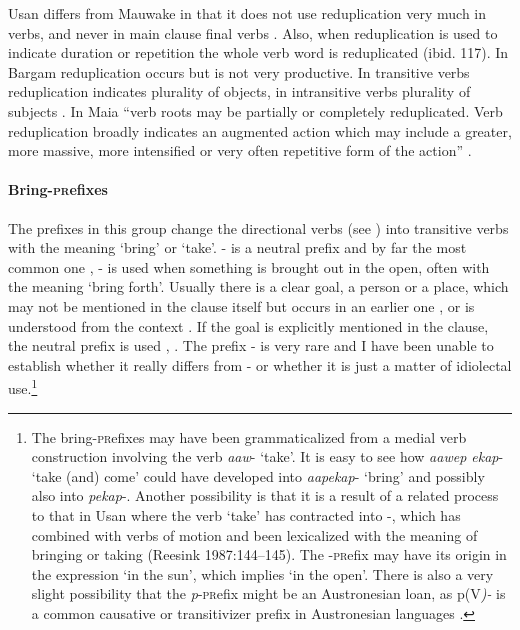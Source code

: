 Usan differs from Mauwake in that it does not use reduplication very much in verbs, and never in main clause final verbs \citep[116]{Reesink1987}. Also, when reduplication is used to indicate duration or repetition the whole verb word is reduplicated (ibid. 117). In Bargam reduplication occurs but is not very productive. In transitive verbs reduplication indicates plurality of objects, in intransitive verbs plurality of subjects \citep[19]{Hepner2002}. In Maia ``{verb roots may be partially or completely reduplicated. Verb reduplication broadly indicates an augmented action which may include a greater, more massive, more intensified or very often repetitive form of the action}'' \citep[50]{Hardin2002}.

\paragraph{Bring-\textsc{pr}efixes}\label{sec:3.8.2.4.2}
{}
The prefixes in this group change the directional verbs (see ) into transitive verbs with the meaning `bring' or `take'. \nobreakdash- is a neutral prefix and by far the most common one , \nobreakdash- is used when something is brought out in the open, often with the meaning `bring forth'. Usually there is a clear goal, a person or a place, which may not be mentioned in the clause itself but occurs in an earlier one , or is understood from the context . If the goal is explicitly mentioned in the clause, the neutral prefix is used , . The prefix \nobreakdash-  is very rare and I have been unable to establish whether it really differs from \nobreakdash- or whether it is just a matter of idiolectal use.\footnote{The bring\nobreakdash-\textsc{pr}efixes may have been grammaticalized from a medial verb construction involving the verb \textit{aaw}\nobreakdash- `take'. It is easy to see how \textit{aawep ekap}\nobreakdash- `take (and) come' could have developed into \textit{aapekap}\nobreakdash- `bring' and possibly also into \textit{pekap}-. Another possibility is that it is a result of a related process to that in Usan where the verb  `take' has contracted into \nobreakdash-, which has combined with verbs of motion and been lexicalized with the meaning of bringing or taking ({Reesink 1987}:144--145). The \nobreakdash-\textsc{pr}efix may have its origin in the expression  `in the sun', which implies `in the open'. There is also a very slight possibility that the \textit{p}\nobreakdash-\textsc{pr}efix might be an Austronesian loan, as p(V\textit{)\nobreakdash-} is a common causative or transitivizer prefix in Austronesian languages \citep[61]{Bugenhagen1995}. }

